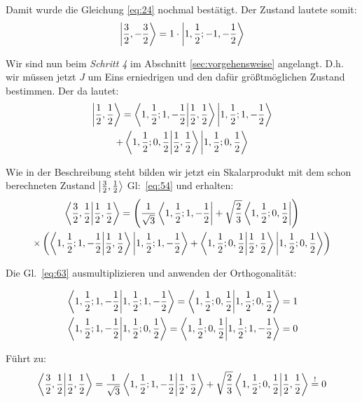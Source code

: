 Damit wurde die Gleichung \eqref{eq:24} nochmal bestätigt. Der Zustand lautete
somit:
\begin{equation}
  \label{eq:61}
  \left| \frac 3 2, -\frac 3 2 \right\rangle= 1\cdot\left| 1,\frac 1 2;-1,-\frac 1 2 \right\rangle
\end{equation}

Wir sind nun beim \emph{Schritt 4} im Abschnitt \ref{sec:vorgehensweise}
angelangt. D.h. wir müssen jetzt \(J\) um Eins erniedrigen und den dafür
größtmöglichen Zustand bestimmen. Der da lautet:
\begin{multline}
  \label{eq:62}
   \ket{\frac 1 2, \frac 1 2}= \braket{1,\frac 1 2;1,-\frac 1 2}
   {\frac 1 2,\frac 1 2}\ket{1,\frac 1 2;1,-\frac 1 2}\\
   +\braket{1,\frac 1 2;0,\frac 1 2}
   {\frac 1 2,\frac 1 2}\ket{1,\frac 1 2;0,\frac 1 2}
\end{multline}

Wie in der Beschreibung steht bilden wir jetzt ein Skalarprodukt mit dem schon
berechneten Zustand \(\left| \frac 3 2, \frac 1 2 \right\rangle\) Gl:~\eqref{eq:54} und erhalten:
\begin{multline}
  \label{eq:63}
  \braket{\frac 3 2,\frac 1 2}{\frac 1 2, \frac 1 2}
  = \left(
    \frac 1 {\sqrt 3}\bra{1,\frac 1 2; 1,-\frac 1 2}
    +\sqrt{\frac 2 3}\bra{1, \frac 1 2; 0, \frac 1 2}\right)\\
  \times\left(
    \braket{1,\frac 1 2;1,-\frac 1 2}{\frac 1 2,\frac 1 2}
    \ket{1,\frac 1 2;1,-\frac 1 2}
    +\braket{1,\frac 1 2;0,\frac 1 2}{\frac 1 2,\frac 1 2}
    \ket{1,\frac 1 2;0,\frac 1 2}\right)
\end{multline}

Die Gl.~\eqref{eq:63} ausmultiplizieren und anwenden der Orthogonalität:

\begin{align}
  \label{eq:65}
  &\braket{1,\frac 1 2; 1,-\frac 1 2}{1,\frac 1 2; 1,-\frac 1 2}
  =\braket{1, \frac 1 2; 0, \frac 1 2}{1, \frac 1 2; 0, \frac 1 2}=1\\
  &\braket{1,\frac 1 2; 1,-\frac 1 2}{1,\frac 1 2;0,\frac 1 2}
  =\braket{1,\frac 1 2;0,\frac 1 2}{1,\frac 1 2; 1,-\frac 1 2}=0
\end{align}

Führt zu:
\begin{equation}
  \label{eq:64}
  \braket{\frac 3 2,\frac 1 2}{\frac 1 2, \frac 1 2}
  = \frac 1 {\sqrt 3}\braket{1,\frac 1 2;1,-\frac 1 2}{\frac 1 2,\frac 1 2}
  +\sqrt{\frac 2 3}\braket{1,\frac 1 2;0,\frac 1 2}{\frac 1 2,\frac 1 2}
  \stackrel{!}=0
\end{equation}


